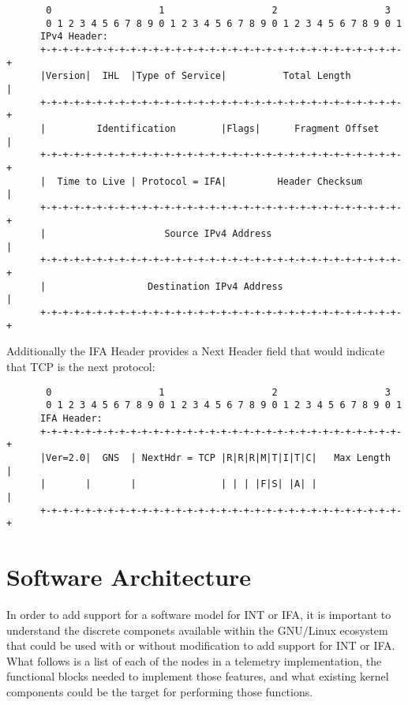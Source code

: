 \documentclass[letterpaper,twocolumn,10pt]{article}
\begin{document}
\tiny
\begin{center}
\begin{verbatim}
       0                   1                   2                   3
       0 1 2 3 4 5 6 7 8 9 0 1 2 3 4 5 6 7 8 9 0 1 2 3 4 5 6 7 8 9 0 1
      IPv4 Header:
      +-+-+-+-+-+-+-+-+-+-+-+-+-+-+-+-+-+-+-+-+-+-+-+-+-+-+-+-+-+-+-+-+
      |Version|  IHL  |Type of Service|          Total Length         |
      +-+-+-+-+-+-+-+-+-+-+-+-+-+-+-+-+-+-+-+-+-+-+-+-+-+-+-+-+-+-+-+-+
      |         Identification        |Flags|      Fragment Offset    |
      +-+-+-+-+-+-+-+-+-+-+-+-+-+-+-+-+-+-+-+-+-+-+-+-+-+-+-+-+-+-+-+-+
      |  Time to Live | Protocol = IFA|         Header Checksum       |
      +-+-+-+-+-+-+-+-+-+-+-+-+-+-+-+-+-+-+-+-+-+-+-+-+-+-+-+-+-+-+-+-+
      |                     Source IPv4 Address                       |
      +-+-+-+-+-+-+-+-+-+-+-+-+-+-+-+-+-+-+-+-+-+-+-+-+-+-+-+-+-+-+-+-+
      |                  Destination IPv4 Address                     |
      +-+-+-+-+-+-+-+-+-+-+-+-+-+-+-+-+-+-+-+-+-+-+-+-+-+-+-+-+-+-+-+-+
\end{verbatim}
\end{center}
\normalsize

Additionally the IFA Header provides a Next Header field that would
indicate that TCP is the next protocol:

\tiny
\begin{center}
\begin{verbatim}
       0                   1                   2                   3
       0 1 2 3 4 5 6 7 8 9 0 1 2 3 4 5 6 7 8 9 0 1 2 3 4 5 6 7 8 9 0 1
      IFA Header:
      +-+-+-+-+-+-+-+-+-+-+-+-+-+-+-+-+-+-+-+-+-+-+-+-+-+-+-+-+-+-+-+-+
      |Ver=2.0|  GNS  | NextHdr = TCP |R|R|R|M|T|I|T|C|   Max Length  |
      |       |       |               | | | |F|S| |A| |               |
      +-+-+-+-+-+-+-+-+-+-+-+-+-+-+-+-+-+-+-+-+-+-+-+-+-+-+-+-+-+-+-+-+
\end{verbatim}
\end{center}
\normalsize

\section{Software Architecture}

In order to add support for a software model for INT or IFA, it is
important to understand the discrete componets available within the
GNU/Linux ecosystem that could be used with or without modification to
add support for INT or IFA.  What follows is a list of each of the
nodes in a telemetry implementation, the functional blocks needed to
implement those features, and what existing kernel components could be
the target for performing those functions.
\end{document}
